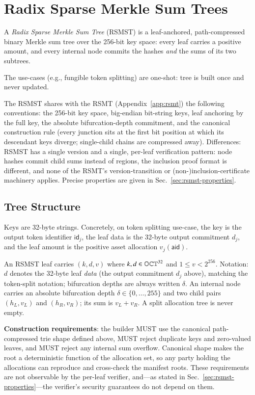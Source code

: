 \section{Radix Sparse Merkle Sum Trees}\label{app:rsmst}

A \emph{Radix Sparse Merkle Sum Tree} (RSMST) is a leaf-anchored, path-compressed binary Merkle sum tree over the 256-bit key space: every leaf carries a positive amount, and every internal node commits the hashes \emph{and} the sums of its two subtrees.

The use-cases (e.g., fungible token splitting) are one-shot: tree is built once and never updated.

The RSMST shares with the RSMT (Appendix~\ref{app:rsmt}) the following conventions: the 256-bit key space, big-endian bit-string keys, leaf anchoring by the full key, the absolute bifurcation-depth commitment, and the canonical construction rule (every junction sits at the first bit position at which its descendant keys diverge; single-child chains are compressed away). Differences: RSMST has a single version and a single, per-leaf verification pattern: node hashes commit child sums instead of regions, the inclusion proof format is different, and none of the RSMT's version-transition or (non-)inclusion-certificate machinery applies. Precise properties are given in Sec.~\ref{sec:rsmst-properties}.

\subsection{Tree Structure}

Keys are 32-byte strings. Concretely, on token splitting use-case, the key is the output token identifier $\mathsf{id}_j$, the leaf data is the 32-byte output commitment $d_j$, and the leaf amount is the positive asset allocation $v_j(\mathsf{aid})$.

An RSMST leaf carries $(k,d,v)$ where $k,d\in\mathbb{OCT}^{32}$ and $1\leq v<2^{256}$. Notation: $d$ denotes the 32-byte leaf \emph{data} (the output commitment $d_j$ above), matching the token-split notation; bifurcation depths are always written $\delta$. An internal node carries an absolute bifurcation depth $\delta\in\{0,\ldots,255\}$ and two child pairs $(h_L,v_L)$ and $(h_R,v_R)$; its sum is $v_L+v_R$. A split allocation tree is never empty.

\textbf{Construction requirements}: the builder MUST use the canonical path-compressed trie shape defined above, MUST reject duplicate keys and zero-valued leaves, and MUST reject any internal sum overflow. Canonical shape makes the root a deterministic function of the allocation set, so any party holding the allocations can reproduce and cross-check the manifest roots. These requirements are not observable by the per-leaf verifier, and---as stated in Sec.~\ref{sec:rsmst-properties}---the verifier's security guarantees do not depend on them.

